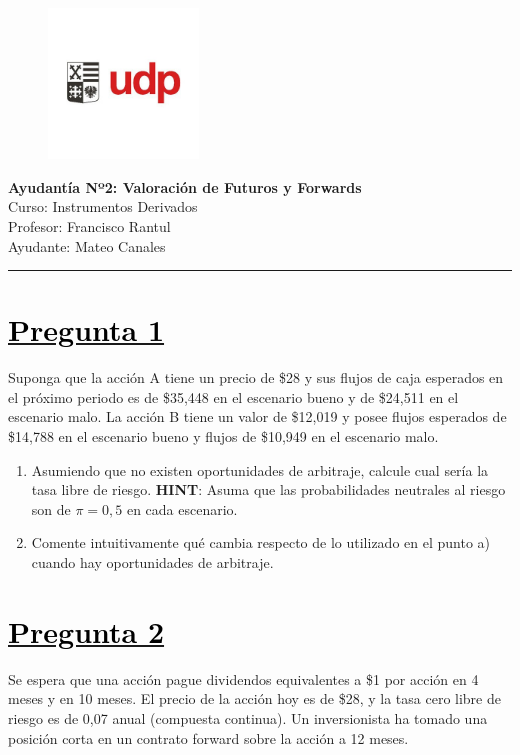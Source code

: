 \documentclass[12pt]{article}
\newcommand{\subrayadoRojo}[1]{{\color{rojoudp}\underline{\textcolor{black}{#1}}}}
\begin{document}
\begin{figure}
    \vspace{-5em}    
    \flushright
    \includegraphics[height=4cm]{../imagenes/logo.png}\\[-3em]
\end{figure}
\begin{center}
    {\LARGE \textbf{Ayudantía Nº2: Valoración de Futuros y Forwards}}\\[0.5em]
    Curso: Instrumentos Derivados\\
    Profesor: Francisco Rantul\\
    Ayudante: Mateo Canales\\
    \date{31/03/2025}
\end{center}
\vspace{1pt}
{\color{rojoudp}\hrule height 2pt}
\vspace{10pt}

\section*{\subrayadoRojo{Pregunta 1}}
Suponga que la acción A tiene un precio de \$28 y sus flujos de caja esperados en el próximo periodo 
es de \$35,448 en el escenario bueno y de \$24,511 en el escenario malo. La acción B tiene un valor de 
\$12,019 y posee flujos esperados de \$14,788 en el escenario bueno y flujos de \$10,949 en el escenario malo. 

\begin{enumerate}[label=\textbf{\alph*)}]
\item   Asumiendo que no existen oportunidades de arbitraje, calcule cual sería la tasa libre de riesgo.
\textbf{HINT}: Asuma que las probabilidades neutrales al riesgo son de $\pi=0,5$ en cada escenario. 

\item   Comente intuitivamente qué cambia respecto de lo utilizado en el punto a) cuando hay oportunidades de arbitraje. 

\end{enumerate}

\section*{\subrayadoRojo{Pregunta 2}}
Se espera que una acción pague dividendos equivalentes a \$1 por acción en 4 meses y en 10 meses.
El precio de la acción hoy es de \$28, y la tasa cero libre de riesgo es de 0,07 anual (compuesta continua).
Un inversionista ha tomado una posición corta en un contrato forward sobre la acción a 12 meses.
\end{document}
